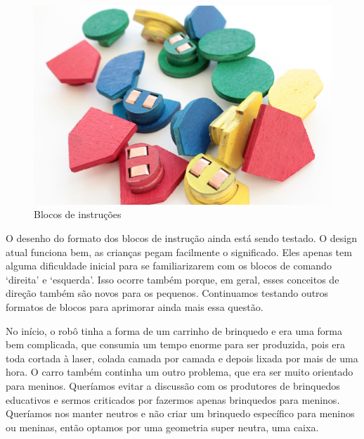 \documentclass[paper=a4, fontsize=11pt]{scrartcl} %
\numberwithin{equation}{section} %
\numberwithin{figure}{section} %
\numberwithin{table}{section} %
\begin{document}
 
 \begin{figure}[t] %
 \centering
 \includegraphics[scale=0.15]{./imagens/instruction-blocks.jpg}
 \caption[ ]{Blocos de instruções}
 \end{figure}
 
 O desenho do formato dos blocos de instrução ainda está sendo testado. O design atual funciona bem, as crianças pegam facilmente o significado. Eles apenas tem alguma dificuldade inicial para se familiarizarem com os blocos de comando ‘direita' e ‘esquerda’. Isso ocorre também porque, em geral, esses conceitos de direção também são novos para os pequenos. Continuamos testando outros formatos de blocos para aprimorar ainda mais essa questão.
 
 No início, o robô tinha a forma de um carrinho de brinquedo e era uma forma bem complicada, que consumia um tempo enorme para ser produzida, pois era toda cortada à laser, colada camada por camada e depois lixada por mais de uma hora. O carro também continha um outro problema, que era ser muito orientado para meninos. Queríamos evitar a discussão com os produtores de brinquedos educativos e sermos criticados por fazermos apenas brinquedos para meninos. Queríamos nos manter neutros e não criar um brinquedo específico para meninos ou meninas, então optamos por uma geometria super neutra, uma caixa.
 
\end{document}
